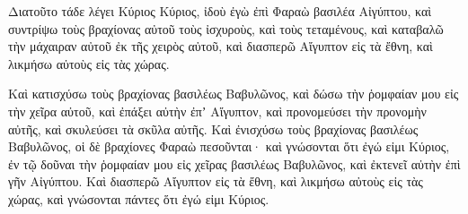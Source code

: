 {Διατοῦτο τάδε λέγει Κύριος Κύριος, ἰδοὺ ἐγὼ ἐπὶ Φαραὼ βασιλέα Αἰγύπτου, καὶ συντρίψω τοὺς βραχίονας αὐτοῦ τοὺς ἰσχυροὺς, καὶ τοὺς τεταμένους, καὶ καταβαλῶ τὴν μάχαιραν αὐτοῦ ἐκ τῆς χειρὸς αὐτοῦ,
καὶ διασπερῶ Αἴγυπτον εἰς τὰ ἔθνη, καὶ λικμήσω αὐτοὺς εἰς τὰς χώρας.
\par }{\PP {}Καὶ κατισχύσω τοὺς βραχίονας βασιλέως Βαβυλῶνος, καὶ δώσω τὴν ῥομφαίαν μου εἰς τὴν χεῖρα αὐτοῦ, καὶ ἐπάξει αὐτὴν ἐπʼ Αἴγυπτον, καὶ προνομεύσει τὴν προνομὴν αὐτῆς, καὶ σκυλεύσει τὰ σκῦλα αὐτῆς.
Καὶ ἐνισχύσω τοὺς βραχίονας βασιλέως Βαβυλῶνος, οἱ δὲ βραχίονες Φαραὼ πεσοῦνται· καὶ γνώσονται ὅτι ἐγώ εἰμι Κύριος, ἐν τῷ δοῦναι τὴν ῥομφαίαν μου εἰς χεῖρας βασιλέως Βαβυλῶνος, καὶ ἐκτενεῖ αὐτὴν ἐπὶ γῆν Αἰγύπτου.
Καὶ διασπερῶ Αἴγυπτον εἰς τὰ ἔθνη, καὶ λικμήσω αὐτοὺς εἰς τὰς χώρας, καὶ γνώσονται πάντες ὅτι ἐγώ εἰμι Κύριος.

}
